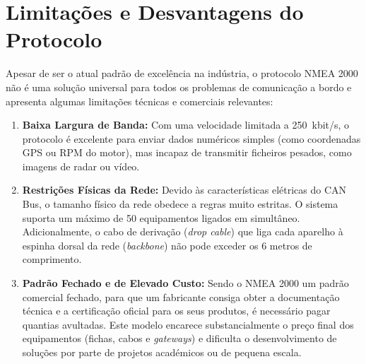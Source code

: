 \section{Limitações e Desvantagens do Protocolo}
Apesar de ser o atual padrão de excelência na indústria, o protocolo NMEA 2000 não é uma solução universal para todos os problemas de comunicação a bordo e apresenta algumas limitações técnicas e comerciais relevantes:
\begin{enumerate}
    \item \textbf{Baixa Largura de Banda:} Com uma velocidade limitada a 250~kbit/s, o protocolo é excelente para enviar dados numéricos simples (como coordenadas GPS ou RPM do motor), mas incapaz de transmitir ficheiros pesados, como imagens de radar ou vídeo.
    \item \textbf{Restrições Físicas da Rede:} Devido às características elétricas do CAN Bus, o tamanho físico da rede obedece a regras muito estritas. O sistema suporta um máximo de 50 equipamentos ligados em simultâneo. Adicionalmente, o cabo de derivação (\textit{drop cable}) que liga cada aparelho à espinha dorsal da rede (\textit{backbone}) não pode exceder os 6 metros de comprimento.
    \item \textbf{Padrão Fechado e de Elevado Custo:} Sendo o NMEA 2000 um padrão comercial fechado, para que um fabricante consiga obter a documentação técnica e a certificação oficial para os seus produtos, é necessário pagar quantias avultadas. Este modelo encarece substancialmente o preço final dos equipamentos (fichas, cabos e \textit{gateways}) e dificulta o desenvolvimento de soluções por parte de projetos académicos ou de pequena escala.
\end{enumerate}

